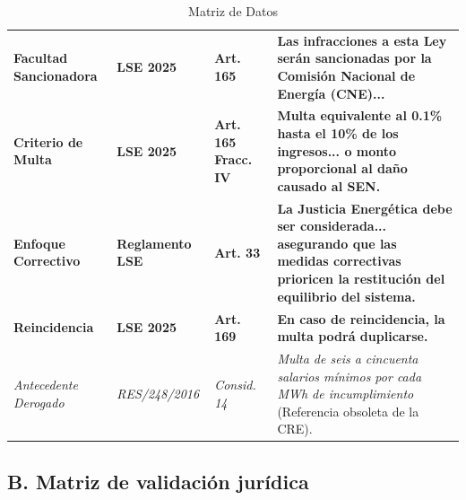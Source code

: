 \documentclass{cel}
\begin{document}
\vspace{0.3cm}
\begin{tabladoradoLargo}
\renewcommand{\tabularxcolumn}[1]{p{#1}}
\begin{xltabular}{\textwidth}{|X|X|X|X|}
\caption{Matriz de Datos} \\
\toprule
{}  &  &  &  \\
\midrule
\endhead
\textbf{Facultad Sancionadora} & \textbf{LSE 2025} & \textbf{Art. 165} & \textbf{\textquotedbl{}Las infracciones a esta Ley serán sancionadas por la Comisión Nacional de Energía (CNE)...\textquotedbl{}} \\ \hline
\textbf{Criterio de Multa} & \textbf{LSE 2025} & \textbf{Art. 165 Fracc. IV} & \textbf{\textquotedbl{}Multa equivalente al 0.1\% hasta el 10\% de los ingresos... o monto proporcional al daño causado al SEN.\textquotedbl{}} \\ \hline
\textbf{Enfoque Correctivo} & \textbf{Reglamento LSE} & \textbf{Art. 33} & \textbf{\textquotedbl{}La Justicia Energética debe ser considerada... asegurando que las medidas correctivas prioricen la restitución del equilibrio del sistema.\textquotedbl{}} \\ \hline
\textbf{Reincidencia} & \textbf{LSE 2025} & \textbf{Art. 169} & \textbf{\textquotedbl{}En caso de reincidencia, la multa podrá duplicarse.\textquotedbl{}} \\ \hline
\textit{Antecedente Derogado} & \textit{RES/248/2016} & \textit{Consid. 14} & \textit{\textquotedbl{}Multa de seis a cincuenta salarios mínimos por cada MWh de incumplimiento\textquotedbl{}} (Referencia obsoleta de la CRE). \\ \hline
\bottomrule
\end{xltabular}
\end{tabladoradoLargo}

\vspace{0.4cm}
\subsection{B. Matriz de validación jurídica}
\nopagebreak
\end{document}
